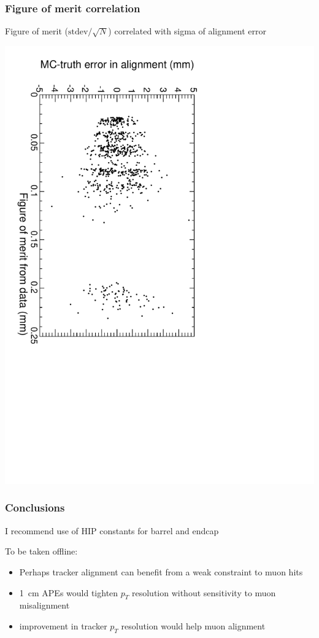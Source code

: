 \documentclass[compress]{beamer}
\begin{document}
\begin{frame}
\frametitle{Figure of merit correlation}
\small

\vfill
Figure of merit ($\mbox{stdev}/\sqrt{N}$) correlated with sigma of alignment error

\includegraphics[height=\linewidth, angle=90]{correlation_trackerbest.pdf}
\end{frame}


\begin{frame}
\frametitle{Conclusions}

I recommend use of HIP constants for barrel and endcap

\vfill
To be taken offline:
\begin{itemize}
\item Perhaps tracker alignment can benefit from a weak constraint to muon hits
\item 1~cm APEs would tighten $p_T$ resolution without sensitivity to muon misalignment
\item improvement in tracker $p_T$ resolution would help muon alignment
\end{itemize}

\label{numpages}
\end{frame}
\end{document}
